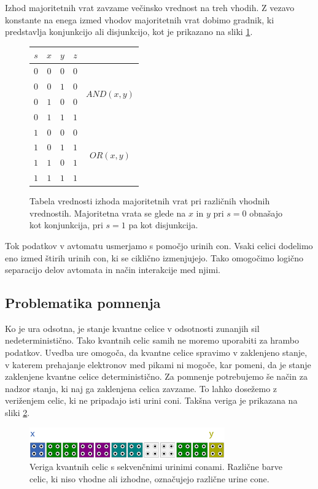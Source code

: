 \documentclass[a4paper, 11pt]{article}
\begin{document}
Izhod majoritetnih vrat zavzame večinsko vrednost na treh vhodih.
Z vezavo konstante na enega izmed vhodov majoritetnih vrat dobimo gradnik, ki predstavlja konjunkcijo ali disjunkcijo, kot je prikazano na sliki \ref{tab-pregled-major}.

\begin{figure}
	\centering
	\small
	\begin{tabular}{c|c|c||c c}
	$s$ & $x$ & $y$ & $z$ \\
	\hline
	\hline
	$0$ & $0$ & $0$ & $0$ & \multirow{4}{*}{$AND(x, y)$} \\
	$0$ & $0$ & $1$ & $0$ \\
	$0$ & $1$ & $0$ & $0$ \\
	$0$ & $1$ & $1$ & $1$ \\
	\hline
	$1$ & $0$ & $0$ & $0$ & \multirow{4}{*}{$OR(x, y)$} \\
	$1$ & $0$ & $1$ & $1$ \\
	$1$ & $1$ & $0$ & $1$ \\
	$1$ & $1$ & $1$ & $1$ \\
	\end{tabular}
	\caption{Tabela vrednosti izhoda majoritetnih vrat pri različnih vhodnih vrednostih. Majoritetna vrata se glede na $x$ in $y$ pri $s = 0$ obnašajo kot konjunkcija, pri $s = 1$ pa kot disjunkcija.}
	\label{tab-pregled-major}
\end{figure}

Tok podatkov v avtomatu usmerjamo s pomočjo urinih con.
Vsaki celici dodelimo eno izmed štirih urinih con, ki se ciklično izmenjujejo.
Tako omogočimo logično separacijo delov avtomata in način interakcije med njimi.

\subsection{Problematika pomnenja}

Ko je ura odsotna, je stanje kvantne celice v odsotnosti zunanjih sil nedeterministično.
Tako kvantnih celic samih ne moremo uporabiti za hrambo podatkov.
Uvedba ure omogoča, da kvantne celice spravimo v zaklenjeno stanje, v katerem prehajanje elektronov med pikami ni mogoče, kar pomeni, da je stanje zaklenjene kvantne celice deterministično.
Za pomnenje potrebujemo še način za nadzor stanja, ki naj ga zaklenjena celica zavzame.
To lahko dosežemo z veriženjem celic, ki ne pripadajo isti urini coni.
Takšna veriga je prikazana na sliki \ref{img-pregled-seq-linear}.

\begin{figure}[h]
	\centering
	\includegraphics[width=0.75\textwidth]{../img/pregled/seq_linear.pdf}
	\caption{Veriga kvantnih celic s sekvenčnimi urinimi conami. Različne barve celic, ki niso vhodne ali izhodne, označujejo različne urine cone.}
	\label{img-pregled-seq-linear}
\end{figure}
\end{document}
